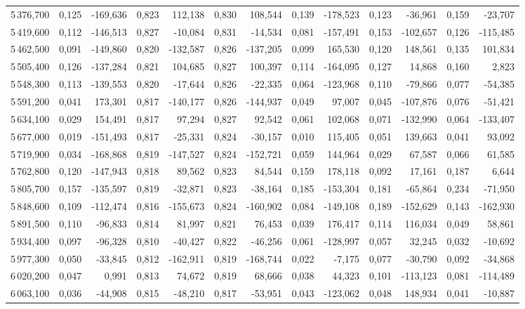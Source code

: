 \begin{longtable}{rrrrrrrrrrrrr}
5\,376,700 & 0,125 & -169,636 & 0,823 & 112,138 & 0,830 & 108,544 & 0,139 & -178,523 & 0,123 & -36,961 & 0,159 & -23,707\\
5\,419,600 & 0,112 & -146,513 & 0,827 & -10,084 & 0,831 & -14,534 & 0,081 & -157,491 & 0,153 & -102,657 & 0,126 & -115,485\\
5\,462,500 & 0,091 & -149,860 & 0,820 & -132,587 & 0,826 & -137,205 & 0,099 & 165,530 & 0,120 & 148,561 & 0,135 & 101,834\\
5\,505,400 & 0,126 & -137,284 & 0,821 & 104,685 & 0,827 & 100,397 & 0,114 & -164,095 & 0,127 & 14,868 & 0,160 & 2,823\\
5\,548,300 & 0,113 & -139,553 & 0,820 & -17,644 & 0,826 & -22,335 & 0,064 & -123,968 & 0,110 & -79,866 & 0,077 & -54,385\\
5\,591,200 & 0,041 & 173,301 & 0,817 & -140,177 & 0,826 & -144,937 & 0,049 & 97,007 & 0,045 & -107,876 & 0,076 & -51,421\\
5\,634,100 & 0,029 & 154,491 & 0,817 & 97,294 & 0,827 & 92,542 & 0,061 & 102,068 & 0,071 & -132,990 & 0,064 & -133,407\\
5\,677,000 & 0,019 & -151,493 & 0,817 & -25,331 & 0,824 & -30,157 & 0,010 & 115,405 & 0,051 & 139,663 & 0,041 & 93,092\\
5\,719,900 & 0,034 & -168,868 & 0,819 & -147,527 & 0,824 & -152,721 & 0,059 & 144,964 & 0,029 & 67,587 & 0,066 & 61,585\\
5\,762,800 & 0,120 & -147,943 & 0,818 & 89,562 & 0,823 & 84,544 & 0,159 & 178,118 & 0,092 & 17,161 & 0,187 & 6,644\\
5\,805,700 & 0,157 & -135,597 & 0,819 & -32,871 & 0,823 & -38,164 & 0,185 & -153,304 & 0,181 & -65,864 & 0,234 & -71,950\\
5\,848,600 & 0,109 & -112,474 & 0,816 & -155,673 & 0,824 & -160,902 & 0,084 & -149,108 & 0,189 & -152,629 & 0,143 & -162,930\\
5\,891,500 & 0,110 & -96,833 & 0,814 & 81,997 & 0,821 & 76,453 & 0,039 & 176,417 & 0,114 & 116,034 & 0,049 & 58,861\\
5\,934,400 & 0,097 & -96,328 & 0,810 & -40,427 & 0,822 & -46,256 & 0,061 & -128,997 & 0,057 & 32,245 & 0,032 & -10,692\\
5\,977,300 & 0,050 & -33,845 & 0,812 & -162,911 & 0,819 & -168,744 & 0,022 & -7,175 & 0,077 & -30,790 & 0,092 & -34,868\\
6\,020,200 & 0,047 & 0,991 & 0,813 & 74,672 & 0,819 & 68,666 & 0,038 & 44,323 & 0,101 & -113,123 & 0,081 & -114,489\\
6\,063,100 & 0,036 & -44,908 & 0,815 & -48,210 & 0,817 & -53,951 & 0,043 & -123,062 & 0,048 & 148,934 & 0,041 & -10,887\\

\end{longtable}
